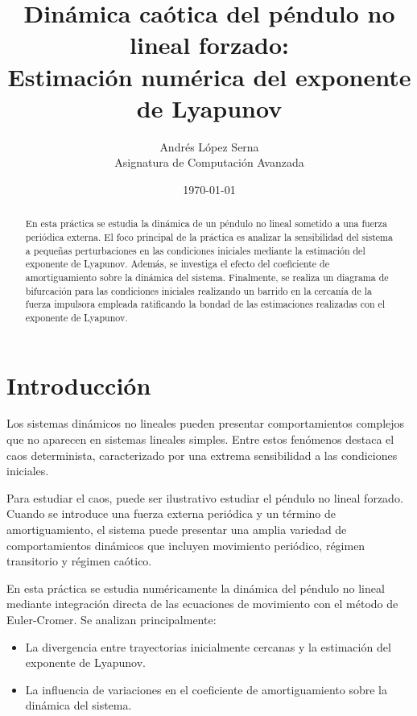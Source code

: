 \documentclass[11pt,a4paper]{article}
\title{Dinámica caótica del péndulo no lineal forzado:\\
Estimación numérica del exponente de Lyapunov}
\author{Andrés López Serna\\
Asignatura de Computación Avanzada}
\date{\today}
\begin{document}
\maketitle

\begin{abstract}

En esta práctica se estudia la dinámica de un péndulo no lineal sometido a una fuerza periódica externa. El foco principal de la práctica es analizar la sensibilidad del sistema a pequeñas perturbaciones en las condiciones iniciales mediante la estimación del exponente de Lyapunov. Además, se investiga el efecto del coeficiente de amortiguamiento sobre la dinámica del sistema. Finalmente, se realiza un diagrama de bifurcación para las condiciones iniciales realizando un barrido en la cercanía de la fuerza impulsora empleada ratificando la bondad de las estimaciones realizadas con el exponente de Lyapunov.

\end{abstract}

\section{Introducción}

Los sistemas dinámicos no lineales pueden presentar comportamientos complejos que no aparecen en sistemas lineales simples. Entre estos fenómenos destaca el caos determinista, caracterizado por una extrema sensibilidad a las condiciones iniciales.

Para estudiar el caos, puede ser ilustrativo estudiar el péndulo no lineal forzado. Cuando se introduce una fuerza externa periódica y un término de amortiguamiento, el sistema puede presentar una amplia variedad de comportamientos dinámicos que incluyen movimiento periódico, régimen transitorio y régimen caótico.

En esta práctica se estudia numéricamente la dinámica del péndulo no lineal mediante integración directa de las ecuaciones de movimiento con el método de Euler-Cromer. Se analizan principalmente:

\begin{itemize}

\item La divergencia entre trayectorias inicialmente cercanas y la estimación del exponente de Lyapunov.

\item La influencia de variaciones en el coeficiente de amortiguamiento sobre la dinámica del sistema.

\end{itemize}
\end{document}
